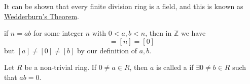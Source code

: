 \begin{remark}
  It can be shown that every finite division ring is a field, and this is known as \href{https://en.wikipedia.org/wiki/Wedderburn_Theorem}{Wedderburn's Theorem}.
\end{remark}

 if $n = ab$ for some integer $n$ with $0 < a, b < n$, then in $\mathbb{Z}$ we have
\begin{equation*}
  [a][b] = [n] = [0]
\end{equation*}
but $[a] \neq [0] \neq [b]$ by our definition of $a, b$.

\begin{defn}
\label{defn:zero_divisor}
  Let $R$ be a non-trivial ring. If $0 \neq a \in R$, then $a$ is called a  if $\exists 0 \neq b \in R$ such that $ab = 0$.
\end{defn}



